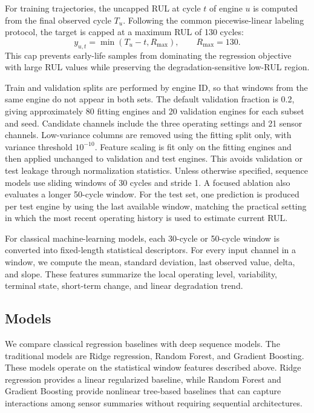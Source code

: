 \documentclass[11pt,a4paper]{article}
\begin{document}
For training trajectories, the uncapped RUL at cycle $t$ of engine $u$ is computed from the final observed cycle $T_u$. Following the common piecewise-linear labeling protocol, the target is capped at a maximum RUL of 130 cycles:
\begin{equation}
y_{u,t} = \min(T_u - t, R_{\max}), \qquad R_{\max}=130.
\end{equation}
This cap prevents early-life samples from dominating the regression objective with large RUL values while preserving the degradation-sensitive low-RUL region.

Train and validation splits are performed by engine ID, so that windows from the same engine do not appear in both sets. The default validation fraction is 0.2, giving approximately 80 fitting engines and 20 validation engines for each subset and seed. Candidate channels include the three operating settings and 21 sensor channels. Low-variance columns are removed using the fitting split only, with variance threshold \(10^{-10}\). Feature scaling is fit only on the fitting engines and then applied unchanged to validation and test engines. This avoids validation or test leakage through normalization statistics. Unless otherwise specified, sequence models use sliding windows of 30 cycles and stride 1. A focused ablation also evaluates a longer 50-cycle window. For the test set, one prediction is produced per test engine by using the last available window, matching the practical setting in which the most recent operating history is used to estimate current RUL.

For classical machine-learning models, each 30-cycle or 50-cycle window is converted into fixed-length statistical descriptors. For every input channel in a window, we compute the mean, standard deviation, last observed value, delta, and slope. These features summarize the local operating level, variability, terminal state, short-term change, and linear degradation trend.

\subsection{Models}

We compare classical regression baselines with deep sequence models. The traditional models are Ridge regression, Random Forest, and Gradient Boosting. These models operate on the statistical window features described above. Ridge regression provides a linear regularized baseline, while Random Forest and Gradient Boosting provide nonlinear tree-based baselines that can capture interactions among sensor summaries without requiring sequential architectures.
\end{document}
